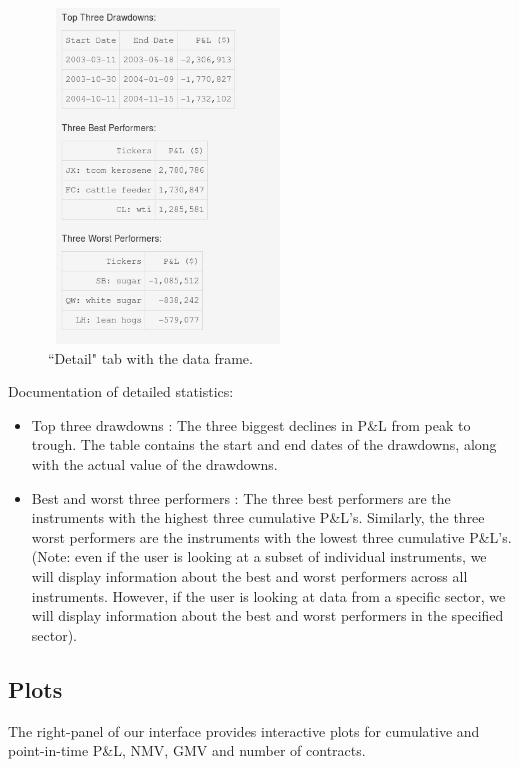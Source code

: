 \documentclass[article]{jss}
\begin{document}
\begin{figure}[H]
\centering
\includegraphics[width = 2.5in, height = 3.5in]{img/detail.png}
\caption{``Detail" tab with the  data frame.
}
\end{figure}

\noindent

Documentation of detailed statistics:

\begin{itemize}
\item{Top three drawdowns : The three biggest declines in P\&L from peak to trough. The table contains the start and end dates of the drawdowns, along with the actual value of the drawdowns.
}
\item{Best and worst three performers : The three best performers are the instruments with the highest three cumulative P\&L's. Similarly, the three worst performers are the instruments with the lowest three cumulative P\&L's. (Note: even if the user is looking at a subset of individual instruments, we will display information about the best and worst performers across all instruments. However, if the user is looking at data from a specific sector, we will display information about the best and worst performers in the specified sector).
}
\end{itemize}

\subsection{Plots}

The right-panel of our  interface provides interactive plots for cumulative and point-in-time P\&L, NMV, GMV and number of contracts.
\end{document}
